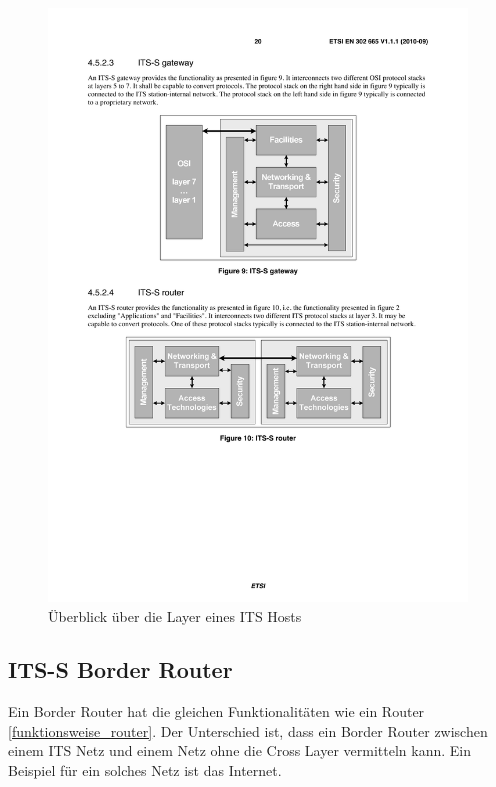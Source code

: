 \begin{figure}
	\includegraphics[width=0.99\textwidth]{content/images/01_funktionsweise/layer_router.pdf}
	\caption{Überblick über die Layer eines ITS Hosts \cite{etsi2010302}}
	\label{fig:funktionsweise_layerHost}
\end{figure}



\subsection{ITS-S Border Router \label{funktionsweise_ITSBorderRouter}}
Ein Border Router hat die gleichen Funktionalitäten wie ein Router \ref{funktionsweise_router}. Der Unterschied ist, dass ein Border Router zwischen einem \ac{ITS} Netz und einem Netz ohne die Cross Layer vermitteln kann. Ein Beispiel für ein solches Netz ist das Internet.

